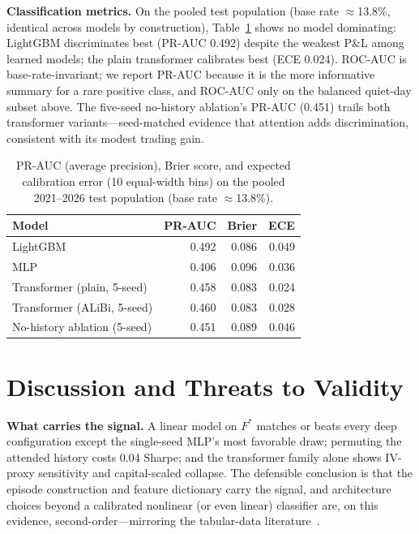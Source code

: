 \documentclass[sigconf,review,anonymous]{acmart}
\begin{document}
\noindent\textbf{Classification metrics.} On the pooled test population (base rate $\approx$13.8\%, identical across models by construction), Table~\ref{tab:calibration} shows no model dominating: LightGBM discriminates best (PR-AUC 0.492) despite the weakest P\&L among learned models; the plain transformer calibrates best (ECE 0.024). ROC-AUC is base-rate-invariant; we report PR-AUC because it is the more informative summary for a rare positive class, and ROC-AUC only on the balanced quiet-day subset above. The five-seed no-history ablation's PR-AUC (0.451) trails both transformer variants---seed-matched evidence that attention adds discrimination, consistent with its modest trading gain.

\begin{table}[t]
\centering
\footnotesize
\begin{tabular}{lrrr}
\toprule
Model & PR-AUC & Brier & ECE \\
\midrule
LightGBM & 0.492 & 0.086 & 0.049 \\
MLP & 0.406 & 0.096 & 0.036 \\
Transformer (plain, 5-seed) & 0.458 & 0.083 & 0.024 \\
Transformer (ALiBi, 5-seed) & 0.460 & 0.083 & 0.028 \\
No-history ablation (5-seed) & 0.451 & 0.089 & 0.046 \\
\bottomrule
\end{tabular}
\caption{PR-AUC (average precision), Brier score, and expected calibration error (10 equal-width bins) on the pooled 2021--2026 test population (base rate $\approx$13.8\%).}
\label{tab:calibration}
\end{table}

\section{Discussion and Threats to Validity}
\label{sec:limitations}

\noindent\textbf{What carries the signal.} A linear model on $F^{\ast}$ matches or beats every deep configuration except the single-seed MLP's most favorable draw; permuting the attended history costs 0.04 Sharpe; and the transformer family alone shows IV-proxy sensitivity and capital-scaled collapse. The defensible conclusion is that the episode construction and feature dictionary carry the signal, and architecture choices beyond a calibrated nonlinear (or even linear) classifier are, on this evidence, second-order---mirroring the tabular-data literature~\cite{grinsztajn2022why,shwartzziv2022tabular,gorishniy2021revisiting}.
\end{document}
